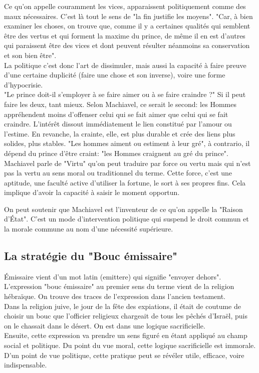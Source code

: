 \documentclass[10pt, a4paper, openany]{book}
\begin{document}
Ce qu'on appelle couramment les vices, apparaissent politiquement comme des maux nécessaires. C'est là tout le sens de "la fin justifie les moyens". "Car, à bien examiner les choses, on trouve que, comme il y a certaines qualités qui semblent être des vertus et qui forment la maxime du prince, de même il en est d'autres qui paraissent être des vices et dont peuvent résulter néanmoins sa conservation et son bien être". \\
La politique c'est donc l'art de dissimuler, mais aussi la capacité à faire preuve d'une certaine duplicité (faire une chose et son inverse), voire une forme d'hypocrisie. \\
"Le prince doit-il s'employer à se faire aimer ou à se faire craindre ?" Si il peut faire les deux, tant mieux. Selon Machiavel, ce serait le second: les Hommes appréhendent moins d'offenser celui qui se fait aimer que celui qui se fait craindre. L'intérêt dissout immédiatement le lien constitué par l'amour ou l'estime. En revanche, la crainte, elle, est plus durable et crée des liens plus solides, plus stables. "Les hommes aiment ou estiment à leur gré", à contrario, il dépend du prince d'être craint: "les Hommes craignent au gré du prince". \\
Machiavel parle de "Virtu" qu'on peut traduire par force ou vertu mais qui n'est pas la vertu au sens moral ou traditionnel du terme. Cette force, c'est une aptitude, une faculté active d'utiliser la fortune, le sort à ses propres fins. Cela implique d'avoir la capacité à saisir le moment opportun. 


On peut soutenir que Machiavel est l'inventeur de ce qu'on appelle la "Raison d'État". C'est un mode d'intervention politique qui suspend le droit commun et la morale commune au nom d'une nécessité supérieure. 


\subsection{La stratégie du "Bouc émissaire"}

Émissaire vient d'un mot latin (emittere) qui signifie "envoyer dehors". L'expression "bouc émissaire" au premier sens du terme vient de la religion hébraïque. On trouve des traces de l'expression dans l'ancien testament. \\
Dans la religion juive, le jour de la fête des expiations, il était de coutume de choisir un bouc que l'officier religieux chargeait de tous les pêchés d'Israël, puis on le chassait dans le désert. On est dans une logique sacrificielle. \\
Ensuite, cette expression va prendre un sens figuré en étant appliqué au champ social et politique. Du point du vue moral, cette logique sacrificielle est immorale. D'un point de vue politique, cette pratique peut se révéler utile, efficace, voire indispensable.
\end{document}

